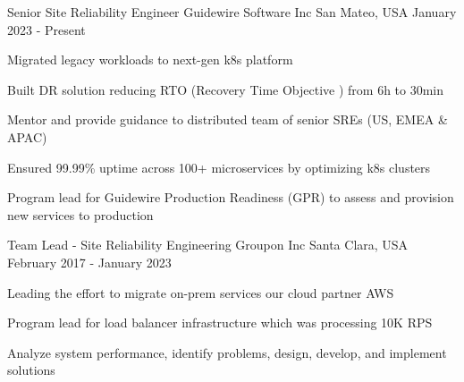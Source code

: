 
\begin{cventries}

  \cventry
    {Senior Site Reliability Engineer} %
    {Guidewire Software Inc} %
    {San Mateo, USA} %
    {January 2023 - Present} %
    {
      \begin{cvitems} %
        \item {Migrated legacy workloads to next-gen k8s platform}
        \item {Built DR solution reducing RTO (Recovery Time Objective ) from 6h to 30min}
        \item {Mentor and provide guidance to distributed team of senior SREs (US, EMEA \& APAC)}
        \item {Ensured 99.99\% uptime across 100+ microservices by optimizing k8s clusters}
        \item {Program lead for Guidewire Production Readiness (GPR) to assess and provision new services to production}
      \end{cvitems}
    }
    
  \cventry
    {Team Lead - Site Reliability Engineering} %
    {Groupon Inc} %
    {Santa Clara, USA} %
    {February 2017 - January 2023} %
    {
      \begin{cvitems} %
        \item {Leading the effort to migrate on-prem services our cloud partner AWS}
        \item {Program lead for load balancer infrastructure which was processing 10K RPS}
        \item {Analyze system performance, identify problems, design, develop, and implement solutions}
      \end{cvitems}
    }


\end{cventries}
